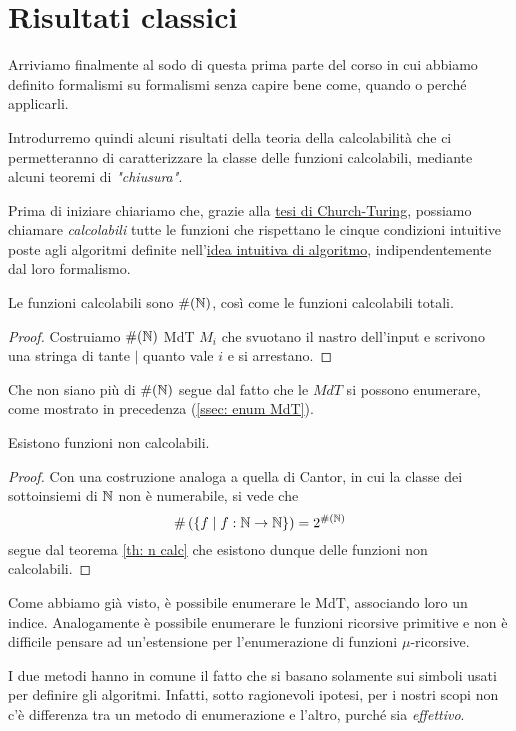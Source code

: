 \section{Risultati classici}
Arriviamo finalmente al sodo di questa prima parte del corso in
cui abbiamo definito formalismi su formalismi senza capire bene
come, quando o perché applicarli.

Introdurremo quindi alcuni risultati della teoria della
calcolabilità che ci permetteranno di caratterizzare la classe
delle funzioni calcolabili, mediante alcuni teoremi di
\emph{"chiusura"}.

Prima di iniziare chiariamo che, grazie alla
\hyperref[th: church-turing]{tesi di Church-Turing}, possiamo
chiamare \emph{calcolabili} tutte le funzioni che rispettano
le cinque condizioni intuitive poste agli algoritmi definite
nell'\hyperref[sec: algoritmo]{idea intuitiva di algoritmo},
indipendentemente dal loro formalismo.

\begin{theorem} \label{th: n calc}
	Le funzioni calcolabili sono $\#(\mathbb{N})$, così come le funzioni
	calcolabili totali.
	\begin{proof}
		Costruiamo $\#(\mathbb{N})$ MdT $M_i$ che svuotano il nastro
		dell'input e scrivono una stringa di tante $|$ quanto
		vale $i$ e si arrestano.
	\end{proof}
\end{theorem}

Che non siano più di $\#(\mathbb{N})$ segue dal fatto che le $MdT$
si possono enumerare, come mostrato in precedenza
(\ref{ssec: enum MdT}).

\begin{theorem}
	Esistono funzioni non calcolabili.
	\begin{proof}
		Con una costruzione analoga a quella di Cantor, in cui
		la classe dei sottoinsiemi di $\mathbb{N}$ non è numerabile,
		si vede che
		\[
			\# \left( \{ f \mid f : \mathbb{N} \to \mathbb{N} \} \right) =
			2^{\#(\mathbb{N})}
		\]
		segue dal teorema \ref{th: n calc} che esistono dunque
		delle funzioni non calcolabili.
	\end{proof}
\end{theorem}

Come abbiamo già visto, è possibile enumerare le MdT, associando
loro un indice. Analogamente è possibile enumerare le funzioni
ricorsive primitive e non è difficile pensare ad un'estensione
per l'enumerazione di funzioni $\mu$-ricorsive.

I due metodi hanno in comune il fatto che si basano solamente
sui simboli usati per definire gli algoritmi. Infatti, sotto
ragionevoli ipotesi, per i nostri scopi non c'è differenza tra
un metodo di enumerazione e l'altro, purché sia \emph{effettivo}.

